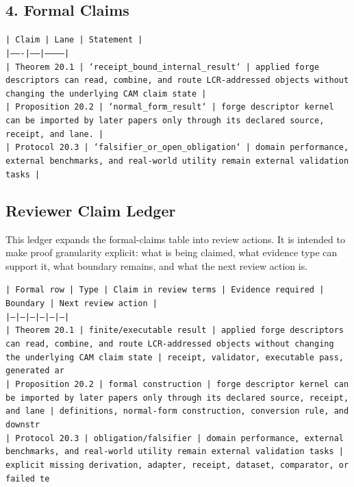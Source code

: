 \documentclass[11pt]{article}
\begin{document}
\subsection*{4. Formal Claims}

\noindent\texttt{| Claim | Lane | Statement |}\\
\noindent\texttt{|-------|------|-----------|}\\
\noindent\texttt{| Theorem 20.1 | `receipt\_bound\_internal\_result` | applied forge descriptors can read, combine, and route LCR-addressed objects without changing the underlying CAM claim state |}\\
\noindent\texttt{| Proposition 20.2 | `normal\_form\_result` | forge descriptor kernel can be imported by later papers only through its declared source, receipt, and lane. |}\\
\noindent\texttt{| Protocol 20.3 | `falsifier\_or\_open\_obligation` | domain performance, external benchmarks, and real-world utility remain external validation tasks |}\\

\subsection*{Reviewer Claim Ledger}

This ledger expands the formal-claims table into review actions. It is intended to make proof granularity explicit: what is being claimed, what evidence type can support it, what boundary remains, and what the next review action is.

\noindent\texttt{| Formal row | Type | Claim in review terms | Evidence required | Boundary | Next review action |}\\
\noindent\texttt{|---|---|---|---|---|---|}\\
\noindent\texttt{| Theorem 20.1 | finite/executable result | applied forge descriptors can read, combine, and route LCR-addressed objects without changing the underlying CAM claim state | receipt, validator, executable pass, generated ar}\\
\noindent\texttt{| Proposition 20.2 | formal construction | forge descriptor kernel can be imported by later papers only through its declared source, receipt, and lane | definitions, normal-form construction, conversion rule, and downstr}\\
\noindent\texttt{| Protocol 20.3 | obligation/falsifier | domain performance, external benchmarks, and real-world utility remain external validation tasks | explicit missing derivation, adapter, receipt, dataset, comparator, or failed te}\\
\end{document}
